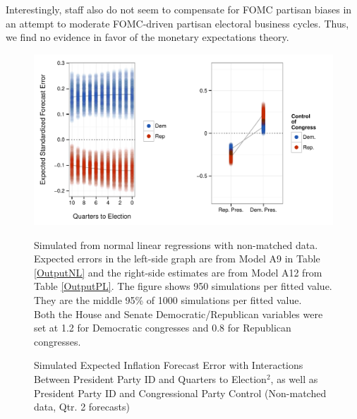 \documentclass[a4paper]{article}\usepackage{graphicx, color}
\newenvironment{knitrout}{}{} %
\begin{document}
Interestingly, staff also do not seem to compensate for FOMC partisan biases in an attempt to moderate FOMC-driven partisan electoral business cycles. Thus, we find no evidence in favor of the monetary expectations theory.

\begin{figure}[t]
    \caption{Simulated Expected Inflation Forecast Error with Interactions Between President Party ID and Quarters to Election$^{2}$, as well as President Party ID and Congressional Party Control (Non-matched data, Qtr. 2 forecasts)}
    \label{InterPlot}
    \begin{center}

\begin{knitrout}
\color{fgcolor}

{\centering \includegraphics[width=0.95\linewidth]{figure/InterPlot} 

}



\end{knitrout}


    \end{center}
    \begin{singlespace}
        {\scriptsize{Simulated from normal linear regressions with non-matched data. Expected errors in the left-side graph are from Model A9 in Table \ref{OutputNL} and the right-side estimates are from Model A12 from Table \ref{OutputPL}. The figure shows 950 simulations per fitted value. They are the middle 95\% of 1000 simulations per fitted value. \\ Both the House and Senate Democratic/Republican variables were set at 1.2 for Democratic congresses and 0.8 for Republican congresses.}}
    \end{singlespace}
\end{figure}
\end{document}
